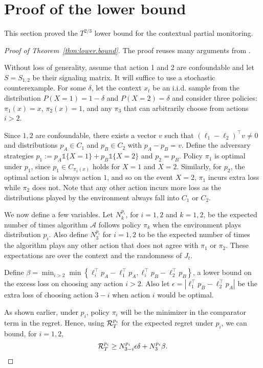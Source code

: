 \documentclass[11pt]{article}
\begin{document}
\section{Proof of the lower bound}\label{appendix:lower.bound.proof}
This section proved the $T^{2/3}$ lower bound for the contextual partial monitoring.
\begin{proof}[Proof of Theorem~\ref{thm:lower.bound}]
  The proof reuses many arguments from \cite{bartok2011minimax}.

  Without loss of generality, assume that action 1 and 2 are confoundable and let $S = S_{1,2}$ be their signaling matrix. It will suffice to use a stochastic counterexample. For some $\delta$, let the context $x_t$ be an i.i.d. sample from the distribution $P(X = 1) = 1-\delta$ and $P(X=2) = \delta$ and consider three policies: $\pi_1(x) = x$, $\pi_2(x) = 1$, and any $\pi_3$ that can arbitrarily choose from actions $i > 2$. 

Since $1,2$ are confoundable, there exists a vector $v$ such that $(\ell_1 - \ell_2)^\top v \neq 0$ and distributions $p_A\in C_1$ and $p_B \in C_2$ with $p_A - p_B = v$. Define the adversary strategies $p_1:= p_A\mathds{1}\{X=1\} + p_B\mathds{1}\{X=2\}$ and $p_2 = p_B$.  Policy $\pi_1$ is optimal under $p_1$, since $p_1 \in C_{\pi_1(x)}$ holds for $X=1$ and $X=2$. Similarly, for $p_2$, the optimal action is always action $1$, and so on the event $X=2$, $\pi_1$ incurs extra loss while $\pi_2$ does not. Note that any other action incurs more loss as the distributions played by the environment always fall into $C_1$ or $C_2$.

We now define a few variables. Let $N_k^{p_i}$, for $i = {1,2}$ and $k = {1,2}$, be the expected number of times algorithm $\mathcal A$ follows policy $\pi_k$ when the environment plays distribution $p_i$. Also define $N_3^{p_i}$ for $i=1,2$ to be the expected number of times the algorithm plays any other action that does not agree with $\pi_1$ or $\pi_2$. These expectations are over the context and the randomness of $J_t$.

Define $\beta = \min_{i>2} \min\left\{\ell_i^\top p_A - \ell_1^\top p_A, \ell_i^\top p_B - \ell_2^\top p_B\right\}$, a lower bound on the excess loss on choosing any action $i>2$. Also let $\epsilon = \left |\ell_1^\top p_B - \ell_2^\top p_A\right|$ be the extra loss of choosing action $3-i$ when action $i$ would be optimal. 

As shown earlier, under $p_i$, policy $\pi_i$ will be the minimizer in the comparator term in the regret. Hence, using $\mathcal R^{p_i}_T$ for the expected regret under $p_i$, we can bound, for $i={1,2}$,
\[
  \mathcal R^{p_i}_T \geq N_{3-i}^{p_i}\epsilon\delta + N_3^{p_i}\beta.
\]


\end{proof}
\end{document}

